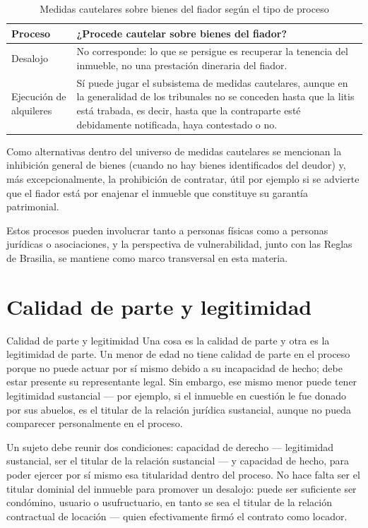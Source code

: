 \documentclass[12pt,oneside]{book}
\begin{document}
\begin{table}[H]
\centering
\caption{Medidas cautelares sobre bienes del fiador según el tipo de proceso}
\begin{tabularx}{\textwidth}{>{\raggedright\arraybackslash}p{} X}
\toprule
\textbf{Proceso} & \textbf{¿Procede cautelar sobre bienes del fiador?} \\
\midrule
Desalojo & No corresponde: lo que se persigue es recuperar la tenencia del inmueble, no una prestación dineraria del fiador. \\
Ejecución de alquileres & Sí puede jugar el subsistema de medidas cautelares, aunque en la generalidad de los tribunales no se conceden hasta que la litis está trabada, es decir, hasta que la contraparte esté debidamente notificada, haya contestado o no. \\
\bottomrule
\end{tabularx}
\end{table}

Como alternativas dentro del universo de medidas cautelares se mencionan la inhibición general de bienes (cuando no hay bienes identificados del deudor) y, más excepcionalmente, la prohibición de contratar, útil por ejemplo si se advierte que el fiador está por enajenar el inmueble que constituye su garantía patrimonial.

Estos procesos pueden involucrar tanto a personas físicas como a personas jurídicas o asociaciones, y la perspectiva de vulnerabilidad, junto con las Reglas de Brasilia, se mantiene como marco transversal en esta materia.

\section{Calidad de parte y legitimidad}

\begin{definition}{Calidad de parte y legitimidad}
Una cosa es la calidad de parte y otra es la legitimidad de parte. Un menor de edad no tiene calidad de parte en el proceso porque no puede actuar por sí mismo debido a su incapacidad de hecho; debe estar presente su representante legal. Sin embargo, ese mismo menor puede tener legitimidad sustancial --- por ejemplo, si el inmueble en cuestión le fue donado por sus abuelos, es el titular de la relación jurídica sustancial, aunque no pueda comparecer personalmente en el proceso.
\end{definition}

\begin{important}
Un sujeto debe reunir dos condiciones: capacidad de derecho --- legitimidad sustancial, ser el titular de la relación sustancial --- y capacidad de hecho, para poder ejercer por sí mismo esa titularidad dentro del proceso. No hace falta ser el titular dominial del inmueble para promover un desalojo: puede ser suficiente ser condómino, usuario o usufructuario, en tanto se sea el titular de la relación contractual de locación --- quien efectivamente firmó el contrato como locador.
\end{important}
\end{document}
